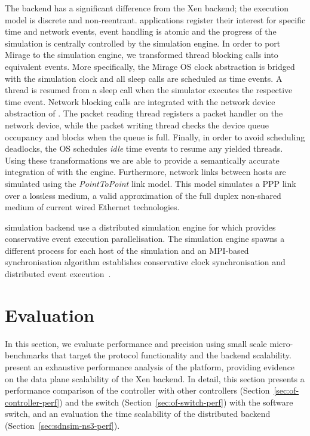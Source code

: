 The  backend has a significant difference from the Xen backend; the
execution model is discrete and non-reentrant.  applications register
their interest for specific time and network events, event handling is atomic
and the progress of the simulation is centrally controlled by the simulation
engine. In order to port Mirage to the  simulation engine, we transformed
thread blocking calls into equivalent  events.  More specifically, the
Mirage OS clock abstraction is bridged with the  simulation clock and all
sleep calls are scheduled as  time events.  A thread is resumed from a
sleep call when the simulator executes the respective time event.  Network
blocking calls are integrated with the network device abstraction of .
The packet reading thread registers a packet handler on the network device,
while the packet writing thread checks the device queue occupancy and blocks
when the queue is full. Finally, in order to avoid scheduling deadlocks, the OS
schedules {\it idle} \/time events to resume any yielded threads. Using these
transformations we are able to provide a semantically accurate integration of
\mirage with the  engine.  Furthermore, network links between hosts are
simulated using the {\it PointToPoint} \/link model. This model simulates a PPP
link over a lossless medium, a valid approximation of the full duplex
non-shared medium of current wired Ethernet technologies.

\sdnsim simulation backend use a distributed simulation engine for  which provides
conservative event execution parallelisation. The simulation engine spawns a
different process for each host of the simulation and an MPI-based
synchronisation algorithm establishes conservative clock synchronisation and
distributed event execution~. 


\section{\sdnsim Evaluation} \label{sec:sdnsim-precision}

In this section, we evaluate \sdnsim performance and precision
using small scale micro-benchmarks that target the \of protocol functionality
and the  backend scalability.   present an
exhaustive performance analysis of the \mirage platform, providing evidence on
the data plane scalability of the Xen backend. In detail, this section presents a
performance comparison of the \mirage \of controller with other controllers
(Section~\ref{sec:of-controller-perf}) and the \mirage \of switch
(Section~\ref{sec:of-switch-perf}) with the \ovs software switch,
and an evaluation the time scalability of the distributed  backend
(Section~\ref{sec:sdnsim-ns3-perf}).

